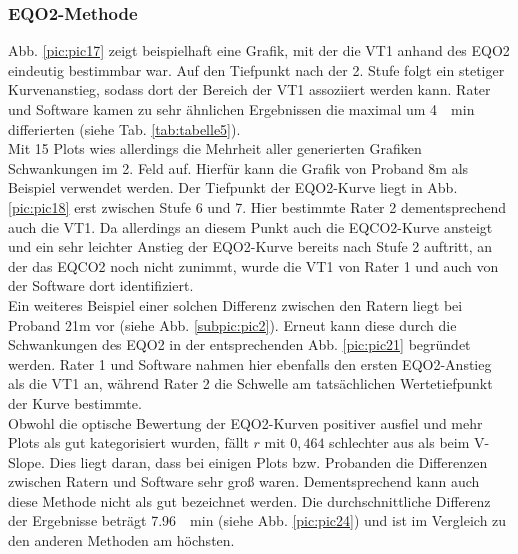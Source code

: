 \subsubsection{\gls{EQO2}-Methode}
%
Abb. \ref{pic:pic17} zeigt beispielhaft eine Grafik, mit der die VT1 anhand des \gls{EQO2} eindeutig bestimmbar war. Auf den Tiefpunkt nach der 2. Stufe folgt ein stetiger Kurvenanstieg, sodass dort der Bereich der VT1 assoziiert werden kann. Rater und Software kamen zu sehr ähnlichen Ergebnissen die maximal um \SI{4}{\per\minute} differierten (siehe Tab. \ref{tab:tabelle5}).\\
Mit 15 Plots wies allerdings die Mehrheit aller generierten Grafiken Schwankungen im 2. Feld auf. Hierfür kann die Grafik von Proband 8m als Beispiel verwendet werden. Der Tiefpunkt der \gls{EQO2}-Kurve liegt in Abb. \ref{pic:pic18} erst zwischen Stufe 6 und 7. Hier bestimmte Rater 2 dementsprechend auch die VT1. Da allerdings an diesem Punkt auch die \gls{EQCO2}-Kurve ansteigt und ein sehr leichter Anstieg der \gls{EQO2}-Kurve bereits nach Stufe 2 auftritt, an der das \gls{EQCO2} noch nicht zunimmt, wurde die VT1 von Rater 1 und auch von der Software dort identifiziert.\\
Ein weiteres Beispiel einer solchen Differenz zwischen den Ratern liegt bei Proband 21m vor (siehe Abb. \ref{subpic:pic2}). Erneut kann diese durch die Schwankungen des \gls{EQO2} in der entsprechenden Abb. \ref{pic:pic21} begründet werden. Rater 1 und Software nahmen hier ebenfalls den ersten \gls{EQO2}-Anstieg als die VT1 an, während Rater 2 die Schwelle am tatsächlichen Wertetiefpunkt der Kurve bestimmte.\\
Obwohl die optische Bewertung der \gls{EQO2}-Kurven positiver ausfiel und mehr Plots als gut kategorisiert wurden, fällt $r$ mit $0,464$ schlechter aus als beim V-Slope. Dies liegt daran, dass bei einigen Plots bzw. Probanden die Differenzen zwischen Ratern und Software sehr groß waren. Dementsprechend kann auch diese Methode nicht als gut bezeichnet werden. Die durchschnittliche Differenz der Ergebnisse beträgt \SI{7,96}{\per\minute} (siehe Abb. \ref{pic:pic24}) und ist im Vergleich zu den anderen Methoden am höchsten.
%

